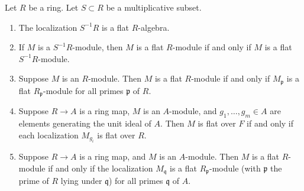\begin{lemma}
\label{lemma-flat-localization}
Let $R$ be a ring. Let $S \subset R$ be a multiplicative subset.
\begin{enumerate}
\item The localization $S^{-1}R$ is a flat $R$-algebra.
\item If $M$ is a $S^{-1}R$-module, then $M$ is a flat $R$-module
if and only if $M$ is a flat $S^{-1}R$-module.
\item Suppose $M$ is an $R$-module. Then
$M$ is a flat $R$-module if and only if $M_{\mathfrak p}$ is a flat
$R_{\mathfrak p}$-module for all primes $\mathfrak p$ of $R$.
\item Suppose $R \to A$ is a ring map, $M$ is an $A$-module,
and $g_1, \ldots, g_m \in A$ are elements generating the unit
ideal of $A$. Then $M$ is flat over $F$ if and only if each localization
$M_{g_i}$ is flat over $R$.
\item Suppose $R \to A$ is a ring map, and $M$ is an $A$-module.
Then $M$ is a flat $R$-module if and only if the localization
$M_{\mathfrak q}$ is a flat $R_{\mathfrak p}$-module
(with $\mathfrak p$ the prime of $R$ lying under $\mathfrak q$)
for all primes $\mathfrak q$ of $A$.
\end{enumerate}
\end{lemma}

